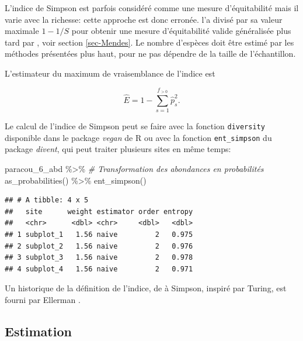 \documentclass[
  11pt,
  american,
  a4paper,
  extrafontsizes,onecolumn,openright
  ]{memoir}
\newenvironment{Shaded}{\begin{snugshade}}{\end{snugshade}}
\newcommand{\CommentTok}[1]{\textcolor[rgb]{0.56,0.35,0.01}{\textit{#1}}}
\newcommand{\FunctionTok}[1]{\textcolor[rgb]{0.00,0.00,0.00}{#1}}
\newcommand{\NormalTok}[1]{#1}
\newcommand{\SpecialCharTok}[1]{\textcolor[rgb]{0.00,0.00,0.00}{#1}}
\newlength{\rf}
\begin{document}
L'indice de Simpson est parfois considéré comme une mesure d'équitabilité \autocite{Olszewski2004} mais il varie avec la richesse: cette approche est donc erronée.
\textcite{Hurlbert1971} l'a divisé par sa valeur maximale \(1 - 1 / S\) pour obtenir une mesure d'équitabilité valide généralisée plus tard par \textcite{Mendes2008}, voir section \ref{sec-Mendes}.
Le nombre d'espèces doit être estimé par les méthodes présentées plus haut, pour ne pas dépendre de la taille de l'échantillon.

L'estimateur du maximum de vraisemblance de l'indice est

\begin{equation}
  \label{eq:EstEML}
  \hat{E} = 1 - \sum^{f_{>0}}_{s=1}{\hat{p}^2_s}.
\end{equation}

Le calcul de l'indice de Simpson peut se faire avec la fonction \texttt{diversity} disponible dans le package \emph{vegan} de R ou avec la fonction \texttt{ent\_simpson} du package \emph{divent}, qui peut traiter plusieurs sites en même temps:

\scriptsize

\begin{Shaded}
\begin{Highlighting}[]
\NormalTok{paracou\_6\_abd }\SpecialCharTok{\%\textgreater{}\%} 
  \CommentTok{\# Transformation des abondances en probabilités}
  \FunctionTok{as\_probabilities}\NormalTok{() }\SpecialCharTok{\%\textgreater{}\%} 
  \FunctionTok{ent\_simpson}\NormalTok{()}
\end{Highlighting}
\end{Shaded}

\begin{verbatim}
## # A tibble: 4 x 5
##   site      weight estimator order entropy
##   <chr>      <dbl> <chr>     <dbl>   <dbl>
## 1 subplot_1   1.56 naive         2   0.975
## 2 subplot_2   1.56 naive         2   0.976
## 3 subplot_3   1.56 naive         2   0.978
## 4 subplot_4   1.56 naive         2   0.971
\end{verbatim}

\normalsize

Un historique de la définition de l'indice, de \textcite{Gini1912} à Simpson, inspiré par Turing, est fourni par Ellerman \autocite*{Ellerman2013}.

\hypertarget{estimation}{%
\subsection{Estimation}\label{estimation}}
\end{document}
